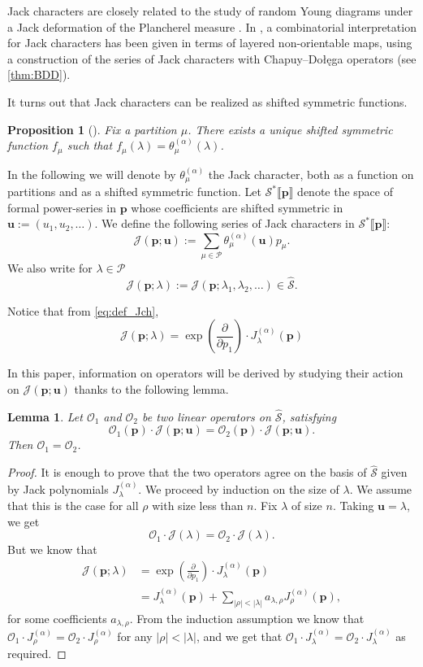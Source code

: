 \documentclass[12pt]{amsart}
\newtheorem{lem}[thm]{Lemma}
\newtheorem{prop}[thm]{Proposition}
\theoremstyle{remark}
\newcommand{\bfp}{\boldsymbol{p}}
\newcommand{\bfu}{\boldsymbol{u}}
\newcommand{\Jch}{\theta^{(\alpha)}}
\newcommand{\J}{{J}^{(\alpha)}}
\newcommand{\YY}{\mathcal{P}}
\newcommand{\mcO}{\mathcal{O}}
\newcommand{\mcJ}{\mathcal{J}}
\newcommand{\mcSh}{\widehat{\mathcal{S}}}
\newcommand{\mcSstar}{\mathcal{S}^*}
\begin{document}
Jack characters are closely related to the study of random Young diagrams under a Jack deformation of the Plancherel measure \cite{DolegaFeray2016,Sniady2019,CuencaDolegaMoll2023}. In \cite{BenDaliDolega2023}, a combinatorial interpretation for Jack characters has been given in terms of layered non-orientable maps, using a construction of the series of Jack characters with Chapuy--Do\l{}e\k{}ga operators (see \cref{thm:BDD}).


It turns out that Jack characters can be realized as shifted symmetric functions.
\begin{prop}[\cite{Lassalle2008b}]
    Fix a partition $\mu$. There exists a unique shifted symmetric function $f_\mu$ such that $f_\mu(\lambda)=\Jch_\mu(\lambda)$. 
\end{prop}
In the following we will denote by $\Jch_\mu$ the Jack character, both as a function on partitions and as a shifted symmetric function. Let $\mcSstar\llbracket \bfp\rrbracket$ denote the space of formal power-series in $\bfp$ whose coefficients are shifted symmetric in $\bfu:=(u_1,u_2,\dots)$.
We define the following series of Jack characters in $\mcSstar\llbracket \bfp\rrbracket$:
$$\mathcal{J}(\bfp;\bfu):=\sum_{\mu\in\YY}\Jch_\mu(\bfu) p_\mu.$$
We also write for $\lambda\in\YY$
$$\mathcal{J}(\bfp;\lambda):=\mathcal{J}(\bfp;\lambda_1,\lambda_2,\dots)\in \mcSh.$$

Notice that from \cref{eq:def_Jch},
\begin{equation}\label{eq:Jch}
          \mcJ(\bfp;\lambda)
        =\exp\left(\frac{\partial}{\partial p_1}\right)\cdot \J_\lambda(\bfp)
\end{equation}

In this paper, information on operators will be derived by studying their action on $\mcJ(\bfp;\bfu)$ thanks to the following lemma.
\begin{lem}\label{lem:action_Ju}
    Let $\mcO_1$ and $\mcO_2$ be two linear operators on $\mcSh$, satisfying 
    $$\mcO_1(\bfp)\cdot \mcJ(\bfp;\bfu)=\mcO_2(\bfp)\cdot \mcJ(\bfp;\bfu).$$
    Then $\mcO_1=\mcO_2$.
\end{lem}
\begin{proof}
    It is enough to prove that the two operators agree on the basis of $\mcSh$ given by Jack polynomials $\J_\lambda$. We proceed by induction on the size of $\lambda$. We assume that this is the case for all $\rho$ with size less than $n$. Fix $\lambda$ of size $n$. Taking $\bfu=\lambda$, we get
    $$\mcO_1\cdot \mcJ(\lambda)=\mcO_2\cdot \mcJ(\lambda).$$
    But we know that 
    \begin{align*}
        \mcJ(\bfp;\lambda)
        &=\exp\left(\frac{\partial}{\partial p_1}\right)\cdot \J_\lambda(\bfp)\\
        &=\J_\lambda(\bfp)+\sum_{|\rho|<|\lambda|}a_{\lambda,\rho}\J_\rho(\bfp),
    \end{align*} 
    for some coefficients $a_{\lambda,\rho}$. From the induction assumption we know that $\mcO_1\cdot \J_\rho=\mcO_2\cdot \J_\rho$ for any $|\rho|<|\lambda|$, and we get that $\mcO_1\cdot \J_\lambda=\mcO_2\cdot \J_\lambda$ as required.
\end{proof}
\end{document}
